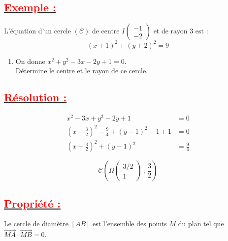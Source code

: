 \documentclass[12pt,a4paper]{article}
\newcounter{solution}
\begin{document}
\subsection*{\underline{\textbf{\textcolor{red}{Exemple :}}}}

L'équation d'un cercle $(\mathcal{C})$ de centre $I \begin{pmatrix} -1 \\ -2 \end{pmatrix}$ et de rayon $3$ est :
\[
(x + 1)^2 + (y + 2)^2 = 9
\]

\begin{enumerate}
    \item[1)] On donne $x^2 + y^2 - 3x - 2y + 1 = 0$. \\
    Détermine le centre et le rayon de ce cercle.
\end{enumerate}

\subsection*{\underline{\textbf{\textcolor{red}{Résolution :}}}}

\begin{align*}
x^2 - 3x + y^2 - 2y + 1 &= 0 \\
\left(x - \frac{3}{2}\right)^2 - \frac{9}{4} + (y - 1)^2 - 1 + 1 &= 0 \\
\left(x - \frac{3}{2}\right)^2 + (y - 1)^2 &= \frac{9}{4}
\end{align*}

\[
\mathcal{C}\left( \Omega \begin{pmatrix} 3/2 \\ 1 \end{pmatrix} \,;\, \frac{3}{2} \right)
\]

\subsection*{\underline{\textbf{\textcolor{red}{Propriété :}}}}

Le cercle de diamètre $[AB]$ est l'ensemble des points $M$ du plan tel que $\overrightarrow{MA} \cdot \overrightarrow{MB} = 0$.

\vspace{0.5cm}
\end{document}
